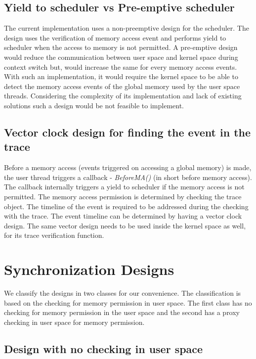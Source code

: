 \subsection{Yield to scheduler vs Pre-emptive scheduler}

The current implementation uses a non-preemptive design for the scheduler. 
The design uses the verification of memory access event and performs yield to scheduler when the access to memory is not permitted. 
A pre-emptive design would reduce the communication between user space and kernel space during context switch but, would increase the same for every memory access events. 
With such an implementation, it would require the kernel space to be able to detect the memory access events of the global memory used by the user space threads. 
Considering the complexity of its implementation and lack of existing solutions such a design would be not feasible to implement. 


\subsection{Vector clock design for finding the event in the trace}

Before a memory access (events triggered on accessing a global memory) is made, the user thread triggers a callback - \emph{BeforeMA()} (in short before memory access). 
The callback internally triggers a yield to scheduler if the memory access is not permitted. 
The memory access permission is determined by checking the trace object. 
The timeline of the event is required to be addressed during the checking with the trace. 
The event timeline can be determined by having a vector clock design. 
The same vector design needs to be used inside the kernel space as well, for its trace verification function.



\section{Synchronization Designs}

We classify the designs in two classes for our convenience. 
The classification is based on the checking for memory permission in user space. 
The first class has no checking for memory permission in the user space and the second has a proxy checking in user space for memory permission. 


\subsection{Design with no checking in user space}

